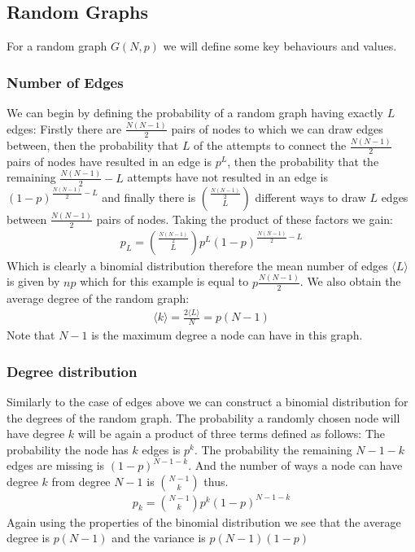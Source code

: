 \documentclass{article}
\begin{document}
        \subsection{Random Graphs}
        For a random graph $G(N,p)$ we will define some key behaviours and values.
            \subsubsection{Number of Edges}
            We can begin by defining the probability of a random graph having exactly $L$ edges:
            Firstly there are $\frac{N(N-1)}{2}$ pairs of nodes to which we can draw edges between, then the probability that $L$ of the attempts to connect the $\frac{N(N-1)}{2}$ pairs of nodes have resulted in an edge is $p^L$, then the probability that the remaining  $\frac{N(N-1)}{2} -L$ attempts have not resulted in an edge is $(1-p)^{\frac{N(N-1)}{2} -L}$ and finally there is $\binom{\frac{N(N-1)}{2}}{L}$ different ways to draw $L$ edges between $\frac{N(N-1)}{2}$ pairs of nodes. Taking the product of these factors we gain:
            \begin{align*}
                p_{L} = \binom{\frac{N(N-1)}{2}}{L}p^L(1-p)^{\frac{N(N-1)}{2} -L}
            \end{align*}
            Which is clearly a binomial distribution therefore the mean number of edges $\langle L \rangle$ is given by $np$ which for this example is equal to $p\frac{N(N-1)}{2}$. We also obtain the average degree of the random graph:
            \begin{align*}
                \langle k \rangle = \frac{2 \langle L \rangle}{N} = p(N-1)
            \end{align*}
            Note that $N-1$ is the maximum degree a node can have in this graph.
            \subsubsection{Degree distribution}
            Similarly to the case of edges above we can construct a binomial distribution for the degrees of the random graph. The probability a randomly chosen node will have degree $k$ will be again a product of three terms defined as follows: The probability the node has $k$ edges is $p^k$. The probability the remaining $N-1-k$ edges are missing is $(1-p)^{N-1-k}$. And the number of ways a node can have degree $k$ from degree $N-1$ is $\binom{N-1}{k}$ thus.
            \begin{align*}
                p_{k} = \binom{N-1}{k}p^k(1-p)^{N-1-k}
            \end{align*}  
            Again using the properties of the binomial distribution we see that the average degree is $p(N-1)$ and the variance is $p(N-1)(1-p)$
\end{document}
